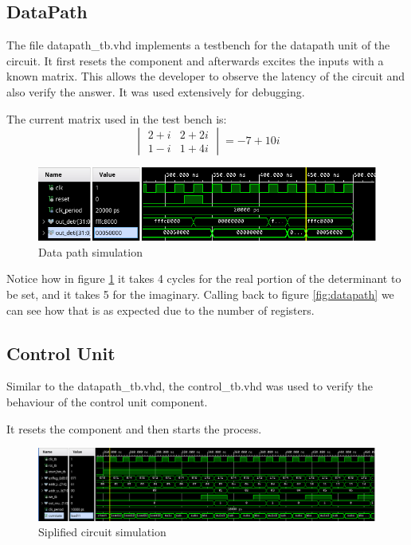 \documentclass[12pt]{article}
\begin{document}
\subsection{DataPath}
The file datapath\_tb.vhd implements a testbench for the datapath unit of the circuit. 
It first resets the component and afterwards excites the inputs with a known matrix. This allows the developer to observe the latency of the circuit and also verify the answer. It was used extensively for debugging. 

The current matrix used in the test bench is:
\begin{equation*}
	\begin{vmatrix} 2+i & 2+2i \\ 
					1-i & 1+4i 
	\end{vmatrix} 
	= -7 + 10i
\end{equation*}

\begin{figure}[!htp]
	\centering
	\includegraphics[width=0.5\linewidth]{images/simDataPath.png}
	\caption{Data path simulation}
	\label{fig:simData}
\end{figure}

Notice how in figure \ref{fig:simData} it takes 4 cycles for the real portion of the determinant to be set, and it takes 5 for the imaginary. Calling back to figure \ref{fig:datapath} we can see how that is as expected due to the number of registers.

\subsection{Control Unit}
Similar to the datapath\_tb.vhd, the control\_tb.vhd was used to verify the behaviour of the control unit component.

It resets the component and then starts the process. 

\begin{figure}[!htp]
	\centering
	\includegraphics[width=0.7\linewidth]{images/simControl.png}
	\caption{Siplified circuit simulation}
	\label{fig:simContro}
\end{figure}
\end{document}
